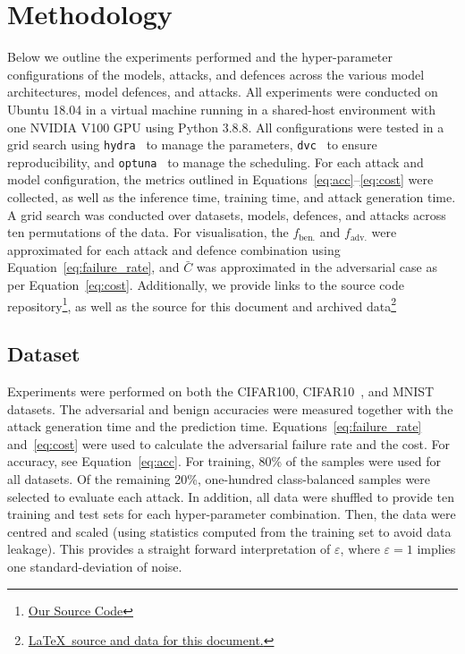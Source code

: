 \section{Methodology}
\label{methods}
Below we outline the experiments performed and the hyper-parameter configurations of the models, attacks, and defences across the various model architectures, model defences, and attacks.
All experiments were conducted on Ubuntu 18.04 in a virtual machine running in a shared-host environment with one NVIDIA V100 GPU using Python 3.8.8.
All configurations were tested in a grid search using \texttt{hydra}~\cite{hydra} to manage the parameters, \texttt{dvc}~\cite{dvc} to ensure reproducibility, and \texttt{optuna}~\cite{optuna} to manage the scheduling.
For each attack and model configuration, the metrics outlined in Equations~\ref{eq:acc}--\ref{eq:cost} were collected, as well as the inference time, training time, and attack generation time.
A grid search was conducted over datasets, models, defences, and attacks across ten permutations of the data. For visualisation, the $f_{\mathrm{ben.}}$ and $f_{\mathrm{adv.}}$ were approximated for each attack and defence combination using Equation~\ref{eq:failure_rate}, and $\bar{C}$ was approximated in the adversarial case as per Equation~\ref{eq:cost}.
Additionally, we provide links to the source code repository\footnote{\href{https://github.com/simplymathematics/deckard/tree/main/examples/pytorch}{Our Source Code}}, as well as the source for this document and archived data\footnote{\href{https://github.com/simplymathematics/ml_afr}{ \LaTeX~source and data for this document.}}



\subsection{Dataset}
\label{dataset}

Experiments were performed on both the CIFAR100, CIFAR10~\cite{cifar}, and MNIST~\cite{mnist} datasets.
The adversarial and benign accuracies were measured together with the attack generation time and the prediction time.
Equations~\ref{eq:failure_rate} and~\ref{eq:cost} were used to calculate the adversarial failure rate and the cost. For accuracy, see Equation~\ref{eq:acc}.
For training, 80\% of the samples were used for all datasets. Of the remaining 20\%, one-hundred class-balanced samples were selected to evaluate each attack.
In addition, all data were shuffled to provide ten training and test sets for each hyper-parameter combination.
Then, the data were centred and scaled (using statistics computed from the training set to avoid data leakage).
This provides a straight forward interpretation of $\varepsilon$, where $\varepsilon = 1$ implies one standard-deviation of noise.


